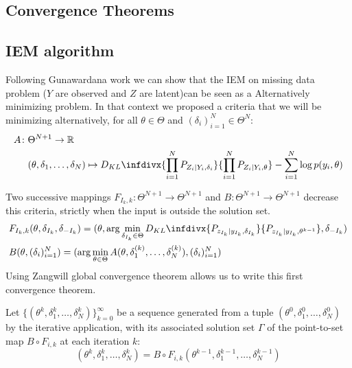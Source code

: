 \documentclass[a0,portrait]{a0poster}
\newcommand{\infdiv}{D_{KL}\infdivx}
\begin{document}
\begin{multicols}{2}
\section{Convergence Theorems}
   
\subsection{IEM algorithm}
Following Gunawardana work we can show that the IEM on missing data problem ($Y$ are observed and $Z$ are latent)can be seen as a Alternatively minimizing problem. In that context we proposed a criteria that we will be minimizing alternatively, for all $\theta \in \Theta$ and $(\delta_i)_{i=1}^N \in \Theta^N$:
\begin{align*}
  A \colon & \Theta^{N+1} \to \mathbb{R}\\
  & (\theta, \delta_1,\dots,\delta_N) \mapsto \infdiv{\prod_{i=1}^{N}{P_{Z_i|Y_i,\delta_i}}}{\prod_{i=1}^{N}{P_{Z_i|Y_i,\theta}}} - \sum_{i=1}^{N}{\log p(y_i,\theta)}
\end{align*}

Two successive mappings $ F_{I_k,k} \colon \Theta^{N+1} \to \Theta^{N+1}$ and $ B \colon \Theta^{N+1} \to \Theta^{N+1}$ decrease this criteria, strictly when the input is outside the solution set.
\begin{align*}
& F_{I_k,k}(\theta,\delta_{I_k},\delta_{-I_k}) = (\theta,\arg \min \limits_{\delta_{I_k} \in \Theta}  \infdiv{P_{z_{I_{k}}|y_{I_{k}},\delta_{I_k}}}{P_{z_{I_{k}}|y_{I_{k}},\theta^{k-1}}},\delta_{-I_k})\\
& B(\theta,(\delta_i)_{i=1}^N) = (\arg \min\limits_{\theta \in \Theta}A(\theta,\delta_1^{(k)},\dots, \delta_N^{(k)}),(\delta_i)_{i=1}^N)
\end{align*}
Using Zangwill global convergence theorem allows us to write this first convergence theorem.

Let $\{(\theta^k, \delta_1^k,\dots, \delta_N^k)\}_{k=0}^{\infty}$ be a sequence generated from a tuple $(\theta^0, \delta_1^0,\dots, \delta_N^0)$ by the iterative application, with its associated solution set $\Gamma$ of the point-to-set map $B \circ F_{i,k}$ at each iteration $k$:
\begin{equation*}
(\theta^k, \delta_1^k,\dots, \delta_N^k) = B \circ F_{i,k}(\theta^{k-1}, \delta_1^{k-1},\dots, \delta_N^{k-1})
\end{equation*}



\end{multicols}
\end{document}
